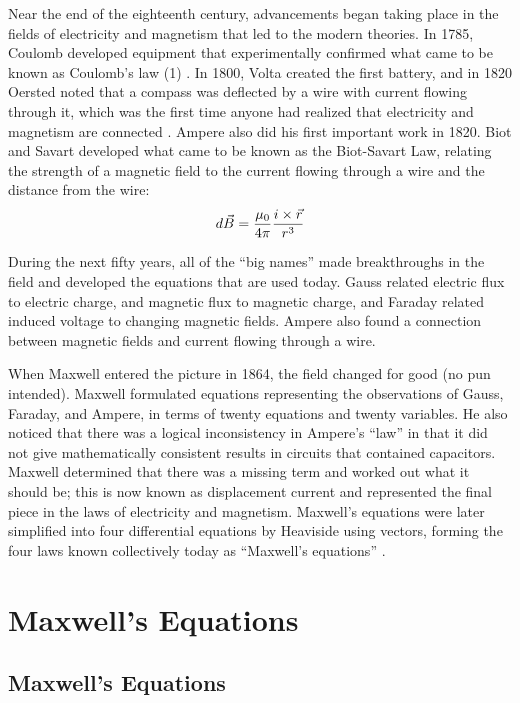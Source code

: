 \documentclass[12pt]{article}
\begin{document}
\indent Near the end of the eighteenth century, advancements began taking place in the fields of electricity and magnetism that led to the modern theories. In 1785, Coulomb developed equipment that experimentally confirmed what came to be known as Coulomb's law (1) \cite{Biggus}. In 1800, Volta created the first battery, and in 1820 Oersted noted that a compass was deflected by a wire with current flowing through it, which was the first time anyone had realized that electricity and magnetism are connected \cite{Biggus}. Ampere also did his first important work in 1820. Biot and Savart developed what came to be known as the Biot-Savart Law, relating the strength of a magnetic field to the current flowing through a wire and the distance from the wire:
\begin{equation}
d\vec{B}=\frac{\mu_0}{4\pi}\frac{i\times\vec{r}}{r^3}
\end{equation}

During the next fifty years, all of the ``big names'' made breakthroughs in the field and developed the equations that are used today. Gauss related electric flux to electric charge, and magnetic flux to magnetic charge, and Faraday related induced voltage to changing magnetic fields. Ampere also found a connection between magnetic fields and current flowing through a wire.

When Maxwell entered the picture in 1864, the field changed for good (no pun intended). Maxwell formulated equations representing the observations of Gauss, Faraday, and Ampere, in terms of twenty equations and twenty variables. He also noticed that there was a logical inconsistency in Ampere's ``law'' in that it did not give mathematically consistent results in circuits that contained capacitors. Maxwell determined that there was a missing term and worked out what it should be; this is now known as displacement current and represented the final piece in the laws of electricity and magnetism. Maxwell's equations were later simplified into four differential equations by Heaviside using vectors, forming the four laws known collectively today as ``Maxwell's equations'' \cite{Wikipedia}.

\section{Maxwell's Equations}

\subsection{Maxwell's Equations}
\end{document}
